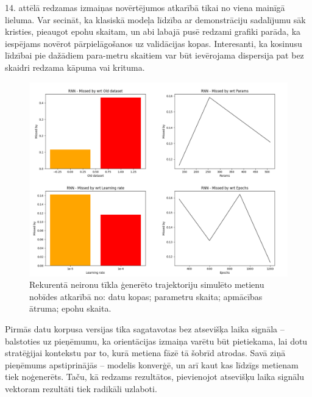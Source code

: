 \documentclass[12pt, a4paper]{article}
\numberwithin{equation}{section} %
\begin{document}
14. attēlā redzamas izmaiņas novērtējumos atkarībā tikai no viena mainīgā lieluma. Var secināt, ka klasiskā modeļa līdzība ar demonstrāciju sadalījumu sāk kristies, pieaugot epohu skaitam, un abi labajā pusē redzami grafiki parāda, ka iespējams novērot pārpielāgošanos uz validācijas kopas. Interesanti, ka kosinusu līdzībai pie dažādiem para-metru skaitiem var būt ievērojama dispersija pat bez skaidri redzama kāpuma vai krituma.

\begin{figure}[t!]
    \centering
    \includegraphics[width=16cm,page=1]{../img/rnn_missed.png}
    \caption{Rekurentā neironu tīkla ģenerēto trajektoriju simulēto metienu nobīdes atkarībā no: datu kopas; parametru skaita; apmācības ātruma; epohu skaita.}
\end{figure}

Pirmās datu korpusa versijas tika sagatavotas bez atsevišķa laika signāla -- balstoties uz pieņēmumu, ka orientācijas izmaiņa varētu būt pietiekama, lai dotu stratēģijai kontekstu par to, kurā metiena fāzē tā šobrīd atrodas. Savā ziņā pieņēmums apstiprinājās -- modelis konverģē, un arī kaut kas līdzīgs metienam tiek noģenerēts. Taču, kā redzams rezultātos, pievienojot atsevišķu laika signālu vektoram rezultāti tiek radikāli uzlaboti.
\end{document}
